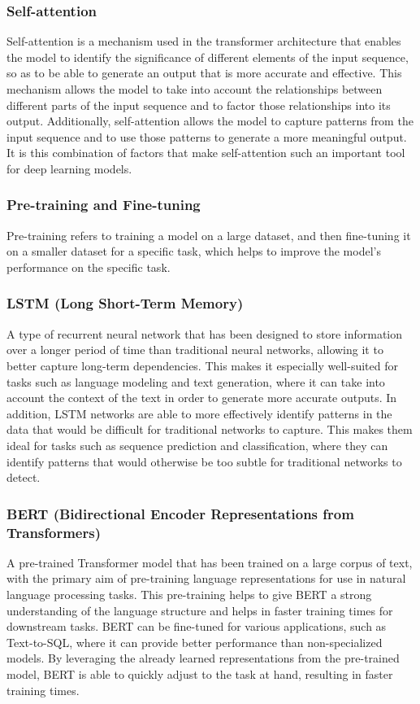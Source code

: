 \subsubsection{Self-attention} Self-attention is a mechanism used in the transformer architecture that enables the model to identify the significance of different elements of the input sequence, so as to be able to generate an output that is more accurate and effective. This mechanism allows the model to take into account the relationships between different parts of the input sequence and to factor those relationships into its output. Additionally, self-attention allows the model to capture patterns from the input sequence and to use those patterns to generate a more meaningful output. It is this combination of factors that make self-attention such an important tool for deep learning models.
\subsubsection{Pre-training and Fine-tuning} Pre-training refers to training a model on a large dataset, and then fine-tuning it on a smaller dataset for a specific task, which helps to improve the model's performance on the specific task.
\subsubsection{LSTM (Long Short-Term Memory)} A type of recurrent neural network that has been designed to store information over a longer period of time than traditional neural networks, allowing it to better capture long-term dependencies. This makes it especially well-suited for tasks such as language modeling and text generation, where it can take into account the context of the text in order to generate more accurate outputs. In addition, LSTM networks are able to more effectively identify patterns in the data that would be difficult for traditional networks to capture. This makes them ideal for tasks such as sequence prediction and classification, where they can identify patterns that would otherwise be too subtle for traditional networks to detect.
\subsubsection{BERT (Bidirectional Encoder Representations from Transformers)} A pre-trained Transformer model that has been trained on a large corpus of text, with the primary aim of pre-training language representations for use in natural language processing tasks. This pre-training helps to give BERT a strong understanding of the language structure and helps in faster training times for downstream tasks. BERT can be fine-tuned for various applications, such as Text-to-SQL, where it can provide better performance than non-specialized models. By leveraging the already learned representations from the pre-trained model, BERT is able to quickly adjust to the task at hand, resulting in faster training times.
